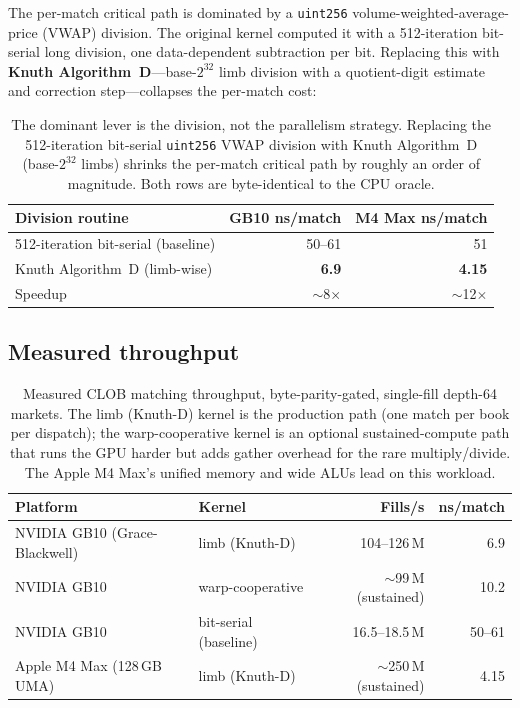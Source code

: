 The per-match critical path is dominated by a \texttt{uint256} volume-weighted-average-price
(VWAP) division. The original kernel computed it with a 512-iteration bit-serial long
division, one data-dependent subtraction per bit. Replacing this with \textbf{Knuth
Algorithm~D}---base-$2^{32}$ limb division with a quotient-digit estimate and correction
step---collapses the per-match cost:

\begin{table}[H]
\centering
\renewcommand{\arraystretch}{1.2}
\begin{tabular}{l r r}
\toprule
\textbf{Division routine} & \textbf{GB10 ns/match} & \textbf{M4 Max ns/match} \\
\midrule
512-iteration bit-serial (baseline) & 50--61 & 51 \\
Knuth Algorithm~D (limb-wise)       & \textbf{6.9} & \textbf{4.15} \\
\midrule
Speedup & $\sim$8$\times$ & $\sim$12$\times$ \\
\bottomrule
\end{tabular}
\caption{The dominant lever is the division, not the parallelism strategy. Replacing the
512-iteration bit-serial \texttt{uint256} VWAP division with Knuth Algorithm~D
(base-$2^{32}$ limbs) shrinks the per-match critical path by roughly an order of magnitude.
Both rows are byte-identical to the CPU oracle.}
\label{tab:division}
\end{table}

\subsection{Measured throughput}

\begin{table}[H]
\centering
\renewcommand{\arraystretch}{1.25}
\begin{tabular}{l l r r}
\toprule
\textbf{Platform} & \textbf{Kernel} & \textbf{Fills/s} & \textbf{ns/match} \\
\midrule
NVIDIA GB10 (Grace-Blackwell) & limb (Knuth-D)        & 104--126\,M & 6.9 \\
NVIDIA GB10                   & warp-cooperative      & $\sim$99\,M (sustained) & 10.2 \\
NVIDIA GB10                   & bit-serial (baseline) & 16.5--18.5\,M & 50--61 \\
Apple M4 Max (128\,GB UMA)    & limb (Knuth-D)        & $\sim$250\,M (sustained) & 4.15 \\
\bottomrule
\end{tabular}
\caption{Measured CLOB matching throughput, byte-parity-gated, single-fill depth-64
markets. The limb (Knuth-D) kernel is the production path (one match per book per
dispatch); the warp-cooperative kernel is an optional sustained-compute path that runs the
GPU harder but adds gather overhead for the rare multiply/divide. The Apple M4 Max's
unified memory and wide ALUs lead on this workload.}
\label{tab:gpu-throughput}
\end{table}

